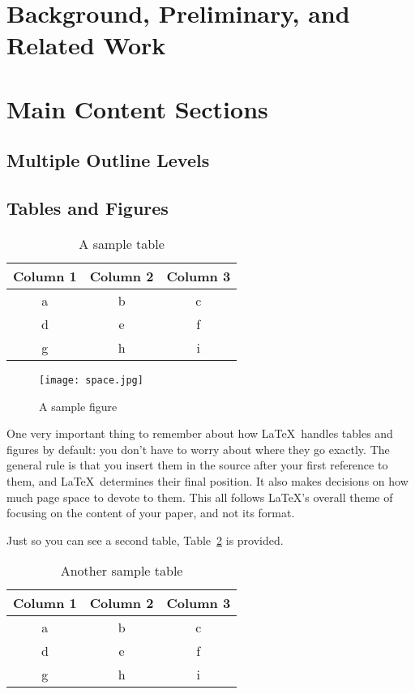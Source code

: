 \documentclass{article}
\begin{document}
\section{Background, Preliminary, and Related Work}


\section{Main Content Sections}



\subsection{Multiple Outline Levels}

\subsection{Tables and Figures}

\begin{table}
\centering
\begin{tabular}{|c|c|c|}\hline
Column 1 & Column 2 & Column 3 \\\hline\hline
a & b & c \\
d & e & f \\
g & h & i \\\hline
\end{tabular}

\caption{A sample table}
\label{table-sample}
\end{table}

\begin{figure}
\centering
\texttt{[image: space.jpg]} 

\caption{A sample figure}
\label{figure-sample}
\end{figure}

One very important thing to remember about how \LaTeX\ handles tables and figures by default: you don't have to worry about where they go exactly.  The general rule is that you insert them in the source after your first reference to them, and \LaTeX\ determines their final position.  It also makes decisions on how much page space to devote to them.  This all follows \LaTeX's overall theme of focusing on the content of your paper, and not its format.

Just so you can see a second table, Table~\ref{table-sample2} is provided.

\begin{table}
\centering
\begin{tabular}{|c|c|c|}\hline
Column 1 & Column 2 & Column 3 \\\hline\hline
a & b & c \\
d & e & f \\
g & h & i \\\hline
\end{tabular}

\caption{Another sample table}
\label{table-sample2}
\end{table}
\end{document}
